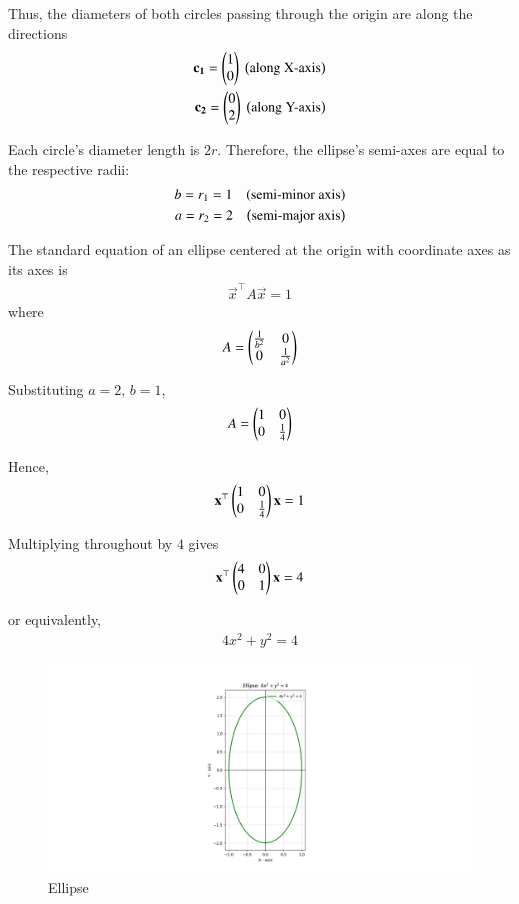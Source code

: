 \documentclass[journal]{IEEEtran}
\begin{document}
Thus, the diameters of both circles passing through the origin are along the directions
\begin{align}
    \mathbf{c_1} = \begin{pmatrix}1\\0\end{pmatrix} \text{ \ensuremath{\left(\text{along X-axis}\right)}}\\
    \mathbf{c_2} = \begin{pmatrix}0\\2\end{pmatrix} \text{ \ensuremath{\left(\text{along Y-axis}\right)}}
\end{align}

Each circle's diameter length is $2r$. Therefore, the ellipse's 
semi-axes are equal to the respective radii:
\begin{align}
    b = r_1 = 1 \quad \text{\ensuremath{\left(\text{semi-minor axis}\right)}}\\
    a = r_2 = 2 \quad \text{\ensuremath{\left(\text{semi-major axis}\right)}}
\end{align}

The standard equation of an ellipse centered at the origin with coordinate axes as its axes is
\begin{align}
    \vec{x}^\top A \vec{x} = 1
\end{align}
where
\begin{align}
    A = \begin{pmatrix}\frac{1}{b^2} & 0 \\ 0 & \frac{1}{a^2}\end{pmatrix}
\end{align}

Substituting $a = 2,\, b = 1$,
\begin{align}
    A = \begin{pmatrix}1 & 0 \\ 0 & \frac{1}{4}\end{pmatrix}
\end{align}

Hence,
\begin{align}
    \mathbf{x}^\top\begin{pmatrix}1 & 0 \\ 0 & \frac{1}{4}\end{pmatrix}\mathbf{x} = 1
\end{align}

Multiplying throughout by $4$ gives
\begin{align}
    \mathbf{x}^\top\begin{pmatrix}4 & 0 \\ 0 & 1\end{pmatrix}\mathbf{x} = 4
\end{align}

or equivalently,
\begin{align}
    4x^2 + y^2 = 4
\end{align}
\begin{figure}[h!]
    \centering
    \includegraphics[width=\columnwidth]{figs/figure_py.png}
    \caption{Ellipse}
    \label{fig:fig}
 \end{figure}
\end{document}
